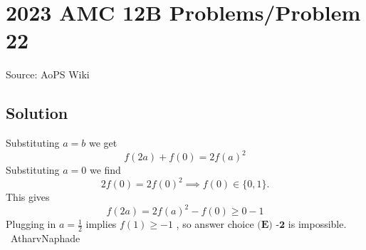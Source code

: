 \documentclass[12pt]{article}
\begin{document}
\section*{{2023 AMC 12B Problems/Problem 22}}
Source: AoPS Wiki

\subsection*{Solution}
Substituting $a = b$ we get \[f(2a) + f(0) = 2f(a)^2\] Substituting $a= 0$ we find \[2f(0) = 2f(0)^2 \implies f(0) \in \{0, 1\}.\] This gives \[f(2a) = 2f(a)^2 - f(0) \geq 0-1\] Plugging in $a = \frac{1}{2}$ implies $f(1) \geq -1$ , so answer choice $\boxed{\textbf{(E) -2}}$ is impossible. ~AtharvNaphade
\end{document}
